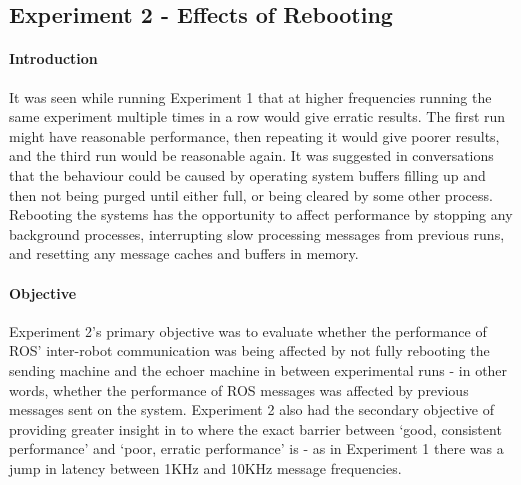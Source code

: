 \documentclass[../dissertation.tex]{subfiles}
\begin{document}
\subsection{Experiment 2 - Effects of Rebooting}
\label{exp-2}

\paragraph{Introduction} It was seen while running Experiment 1 that at higher frequencies running the same experiment multiple times in a row would give erratic results. The first run might have reasonable performance, then repeating it would give poorer results, and the third run would be reasonable again. It was suggested in conversations that the behaviour could be caused by operating system buffers filling up and then not being purged until either full, or being cleared by some other process. Rebooting the systems has the opportunity to affect performance by stopping any background processes, interrupting slow processing messages from previous runs, and resetting any message caches and buffers in memory.


\paragraph{Objective} Experiment 2's primary objective was to evaluate whether the performance of ROS' inter-robot communication was being affected by not fully rebooting the sending machine and the echoer machine in between experimental runs - in other words, whether the performance of ROS messages was affected by previous messages sent on the system. Experiment 2 also had the secondary objective of providing greater insight in to where the exact barrier between `good, consistent performance' and `poor, erratic performance' is - as in Experiment 1 there was a jump in latency between 1KHz and 10KHz message frequencies.
\end{document}
